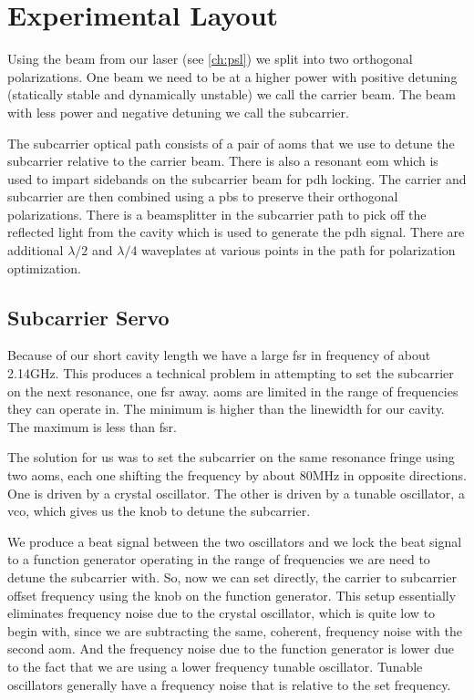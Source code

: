 
\section{Experimental Layout}
Using the beam from our laser (see \ref{ch:psl}) we split into two orthogonal
polarizations. One beam we need to be at a higher power with positive detuning
(statically stable and dynamically unstable) we call the carrier beam. The
beam with less power and negative detuning we call the subcarrier.

The subcarrier optical path consists of a pair of \ac{aom}s that we use to
detune the subcarrier relative to the carrier beam.
There is also a resonant
\ac{eom} which is used to impart sidebands on the subcarrier beam for \ac{pdh}
locking.
The carrier and subcarrier are then combined using a \ac{pbs} to preserve their
orthogonal polarizations. There is a beamsplitter in the subcarrier path to pick
off the reflected light from the cavity which is used to generate the \ac{pdh}
signal. There are additional $\lambda/2$ and $\lambda/4$ waveplates at various
points in the path for polarization optimization.

\subsection{Subcarrier Servo}
Because of our short cavity length we have a large \ac{fsr} in frequency of
about 2.14GHz.
This produces a technical problem in attempting to set the
subcarrier on the next resonance, one \ac{fsr} away.
\ac{aom}s are limited in the range of frequencies they can operate in.
The minimum is higher than the linewidth for our cavity.
The maximum is less than \ac{fsr}.

The solution for us was to set the subcarrier on the same resonance fringe
using two \ac{aom}s, each one shifting the frequency by about 80MHz in
opposite directions.
One is driven by a crystal oscillator.
The other is driven by a tunable oscillator, a \ac{vco}, which gives us the
knob to detune the subcarrier.

We produce a beat signal between the two oscillators and we lock the beat
signal to a function generator operating in the range of frequencies we are
need to detune the subcarrier with. So, now we can set directly, the carrier
to subcarrier offset frequency using the knob on the function generator.
This setup essentially eliminates frequency noise due to the crystal
oscillator, which is quite low to begin with, since we are subtracting the
same, coherent, frequency noise with the second \ac{aom}.
And the frequency noise due to the function generator is lower due to the
fact that we are using a lower frequency tunable oscillator.
Tunable oscillators generally have a frequency noise that is relative to the
set frequency.


